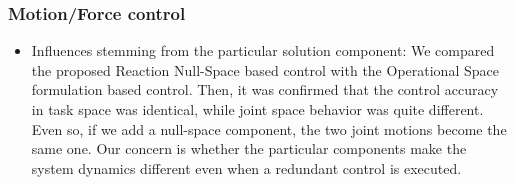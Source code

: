 \subsubsection{Motion/Force control}
%
\begin{itemize}
\item Influences stemming from the particular solution component:
  We compared the proposed Reaction Null-Space based control with the Operational Space formulation
  based control.
  Then, it was confirmed that the control accuracy in task space was identical,
  while joint space behavior was quite different.
  Even so, if we add a null-space component, the two joint motions become the same one.
  Our concern is whether the particular components make the system dynamics different
  even when a redundant control is executed.
\end{itemize}
%

%
%
